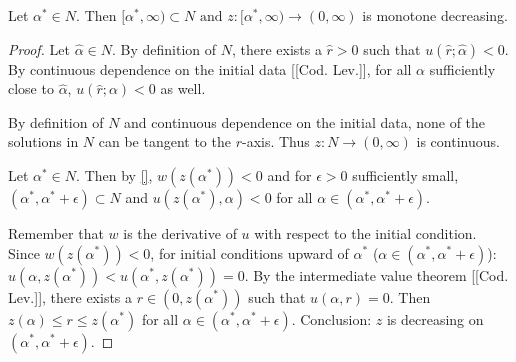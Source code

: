 
\begin{lemma}
  Let $\alpha^*\in N$.
  Then $[\alpha^*,\infty)\subset N\text{ and }z:[\alpha^*,\infty)\to(0,\infty)$ is monotone decreasing.
\begin{proof}


Let $\hat\alpha\in N$.
By definition of $N$, there exists a $\hat r>0$ such that $u(\hat r;\hat\alpha)<0$.
By continuous dependence on the initial data [[Cod. Lev.]],
for all $\alpha$ sufficiently close to $\hat\alpha$, $u(\hat r;\alpha)<0$ as well.

By definition of $N$ and continuous dependence on the initial data,
none of the solutions in $N$ can be tangent to the $r$-axis.
Thus $z:N\to(0,\infty)$ is continuous.


Let $\alpha^*\in N$.
Then by \ref{}, $w(z(\alpha^*))<0$ and for
$\epsilon>0$ sufficiently small,
$(\alpha^*,\alpha^*+\epsilon)\subset N$
and $u(z(\alpha^*),\alpha)<0$
for all $\alpha\in(\alpha^*,\alpha^*+\epsilon)$.

Remember that $w$ is the derivative of $u$ with respect to the initial condition.
Since $w(z(\alpha^*))<0$, for initial conditions upward of $\alpha^*$ ($\alpha\in(\alpha^*,\alpha^*+\epsilon)$):
$u(\alpha,z(\alpha^*))<u(\alpha^*,z(\alpha^*))=0$.
By the intermediate value theorem [[Cod. Lev.]], there exists a $r\in(0,z(\alpha^*))$ such that $u(\alpha,r)=0$.
Then $z(\alpha)\leq r\leq z(\alpha^*)$ for all $\alpha\in(\alpha^*,\alpha^*+\epsilon)$.
Conclusion: $z$ is decreasing on $(\alpha^*,\alpha^*+\epsilon)$.

\seperate


\end{proof}
\end{lemma}
